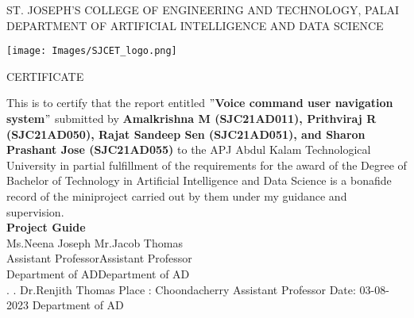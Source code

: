 \newpage
\thispagestyle{empty}
\begin{center}
\normalsize{ST. JOSEPH’S COLLEGE OF ENGINEERING AND TECHNOLOGY, PALAI}\\[0.5cm]
\normalsize
 { DEPARTMENT OF ARTIFICIAL INTELLIGENCE AND DATA SCIENCE}\\[1.0cm]%
   \begin{center}
   \texttt{[image: Images/SJCET\_logo.png]}
   \end{center}
{\large CERTIFICATE}\\[1.5cm]
\end{center}
\normalsize 
This is to certify that the report entitled {\bf $"$Voice command user navigation system$"$} submitted by { \bf Amalkrishna M (SJC21AD011), Prithviraj R (SJC21AD050), Rajat Sandeep Sen (SJC21AD051), and Sharon Prashant Jose (SJC21AD055)} to the APJ Abdul Kalam Technological University in partial fulfillment of the requirements for the award of the Degree of Bachelor of Technology in Artificial Intelligence and Data Science is a bonafide record of the miniproject carried out by them under my guidance and supervision.\vspace{1.2 cm}\\
{\bf Project Guide}\hspace{8.35 cm}{\bf Project Coordinator}\\
Ms.Neena Joseph\hspace{8.0 cm} Mr.Jacob Thomas\\
Assistant Professor\hspace{7.75 cm}Assistant Professor\hspace{2.6 cm}\\Department of AD\hspace{7.8 cm}Department of AD
\vspace{1.0 cm}\\
.\hspace{11.06 cm}{\bf Head of the Department}
\newline
.\hspace{11.01 cm} Dr.Renjith Thomas
\newline
Place : Choondacherry  \hspace{6.87 cm} Assistant Professor
\newline
Date\hspace{0.25 cm}: 03-08-2023 \hspace{7.7 cm} Department of AD
                
